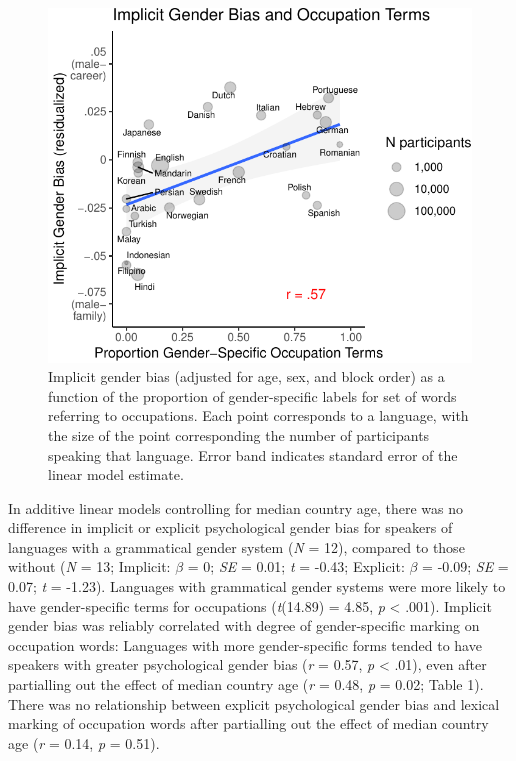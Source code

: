 \documentclass[man,floatsintext]{apa6}
\begin{document}
\begin{figure}
\centering
\includegraphics{iat_lang_pnas_files/figure-latex/unnamed-chunk-14-1.pdf}
\caption{\label{fig:unnamed-chunk-14}Implicit gender bias (adjusted for age, sex, and block order) as a function of the proportion of gender-specific labels for set of words referring to occupations. Each point corresponds to a language, with the size of the point corresponding the number of participants speaking that language. Error band indicates standard error of the linear model estimate.}
\end{figure}

In additive linear models controlling for median country age, there was no difference in implicit or explicit psychological gender bias for speakers of languages with a grammatical gender system (\emph{N} = 12), compared to those without (\emph{N} = 13; Implicit: \(\beta\) = 0; \emph{SE} = 0.01; \emph{t} = -0.43; Explicit: \(\beta\) = -0.09; \emph{SE} = 0.07; \emph{t} = -1.23). Languages with grammatical gender systems were more likely to have gender-specific terms for occupations (\emph{t}(14.89) = 4.85, \emph{p} \textless{} .001). Implicit gender bias was reliably correlated with degree of gender-specific marking on occupation words: Languages with more gender-specific forms tended to have speakers with greater psychological gender bias (\emph{r} = 0.57, \emph{p} \textless{} .01), even after partialling out the effect of median country age (\emph{r} = 0.48, \emph{p} = 0.02; Table 1). There was no relationship between explicit psychological gender bias and lexical marking of occupation words after partialling out the effect of median country age (\emph{r} = 0.14, \emph{p} = 0.51).
\end{document}
